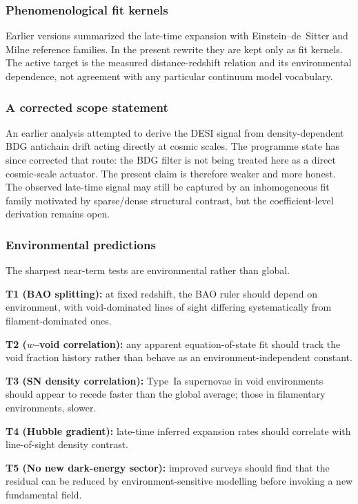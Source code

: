 \documentclass[11pt]{article}
\begin{document}
\subsubsection{Phenomenological fit kernels}

Earlier versions summarized the late-time expansion with Einstein--de~Sitter and Milne reference families. In the present rewrite they are kept only as fit kernels. The active target is the measured distance-redshift relation and its environmental dependence, not agreement with any particular continuum model vocabulary.

\subsubsection{A corrected scope statement}

An earlier analysis attempted to derive the DESI signal from density-dependent BDG antichain drift acting directly at cosmic scales. The programme state has since corrected that route: the BDG filter is not being treated here as a direct cosmic-scale actuator. The present claim is therefore weaker and more honest. The observed late-time signal may still be captured by an inhomogeneous fit family motivated by sparse/dense structural contrast, but the coefficient-level derivation remains open.

\subsubsection{Environmental predictions}

The sharpest near-term tests are environmental rather than global.

\textbf{T1 (BAO splitting):} at fixed redshift, the BAO ruler should depend on environment, with void-dominated lines of sight differing systematically from filament-dominated ones.

\textbf{T2 ($w$--void correlation):} any apparent equation-of-state fit should track the void fraction history rather than behave as an environment-independent constant.

\textbf{T3 (SN density correlation):} Type~Ia supernovae in void environments should appear to recede faster than the global average; those in filamentary environments, slower.

\textbf{T4 (Hubble gradient):} late-time inferred expansion rates should correlate with line-of-sight density contrast.

\textbf{T5 (No new dark-energy sector):} improved surveys should find that the residual can be reduced by environment-sensitive modelling before invoking a new fundamental field.
\end{document}
